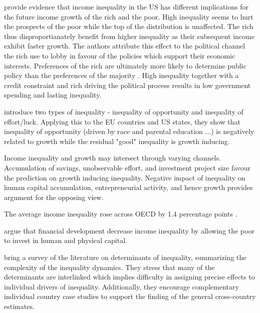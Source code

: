 \documentclass[a4paper,11pt]{article}
\begin{document}
\citet{pikettyandzucman2014}
\citet{van2018inequality} provide evidence that income inequality in the US has different implications for the future income growth of the rich and the poor. High inequality seems to hurt the prospects of the poor while the top of the distribution is unaffected. The rich thus disproportianately benefit from higher inequality as their subsequent income exhibit faster growth. The authors attribute this effect to the political channel the rich use to lobby in favour of the policies which support their economic interests. Preferences of the rich are ultimately more likely to determine public policy than the preferences of the majority \citep{gilens_page_2014}. High inequality together with a credit constraint and rich driving the political process results in low government spending and lasting inequality.

\citet{marrero2013inequality} introduce two types of inequality - inequality of opportunity and inequality of effort/luck. Applying this to the EU countries and US states, they show that inequality of opportunity (driven by race and parental education ...) is negatively related to growth while the residual "good" inequality is growth inducing.

Income inequality and growth may intersect through varying channels. Accumulation of savings, unobservable effort, and investment project size favour the prediction on growth inducing inequality. Negative impact of inequality on human capital accumulation, entrepreneurial activity, and hence growth provides argument for the opposing view.

The average income inequality rose across OECD by 1.4 percentage points \citep{oecd2013crisis}.

\citet{LawSingh2014} argue that financial development decrease income inequality by allowing the poor to invest in human and physical capital.

\citet{nolan2019drivers} bring a survey of the literature on determinants of inequality, summarizing the complexity of the inequality dynamics. They stress that many of the determinants are interlinked which implies difficulty in assigning precise effects to individual drivers of inequality. Additionally, they encourage complementary individual country case studies to support the finding of the general cross-country estimates.
\end{document}
